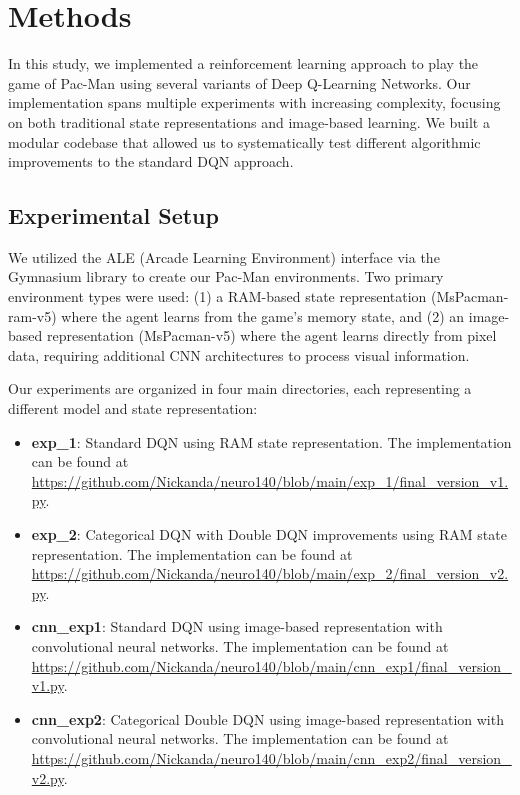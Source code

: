 \documentclass{article} %
\begin{document}
\section{Methods}

In this study, we implemented a reinforcement learning approach to play the game of Pac-Man using several variants of Deep Q-Learning Networks. Our implementation spans multiple experiments with increasing complexity, focusing on both traditional state representations and image-based learning. We built a modular codebase that allowed us to systematically test different algorithmic improvements to the standard DQN approach.

\subsection{Experimental Setup}

We utilized the ALE (Arcade Learning Environment) interface via the Gymnasium library to create our Pac-Man environments. Two primary environment types were used: (1) a RAM-based state representation (MsPacman-ram-v5) where the agent learns from the game's memory state, and (2) an image-based representation (MsPacman-v5) where the agent learns directly from pixel data, requiring additional CNN architectures to process visual information.

Our experiments are organized in four main directories, each representing a different model and state representation:
\begin{itemize}
  \item \textbf{exp\_1}: Standard DQN using RAM state representation. The implementation can be found at \url{https://github.com/Nickanda/neuro140/blob/main/exp_1/final_version_v1.py}.
  \item \textbf{exp\_2}: Categorical DQN with Double DQN improvements using RAM state representation. The implementation can be found at \url{https://github.com/Nickanda/neuro140/blob/main/exp_2/final_version_v2.py}.
  \item \textbf{cnn\_exp1}: Standard DQN using image-based representation with convolutional neural networks. The implementation can be found at \url{https://github.com/Nickanda/neuro140/blob/main/cnn_exp1/final_version_v1.py}.
  \item \textbf{cnn\_exp2}: Categorical Double DQN using image-based representation with convolutional neural networks. The implementation can be found at \url{https://github.com/Nickanda/neuro140/blob/main/cnn_exp2/final_version_v2.py}.
\end{itemize}
\end{document}
